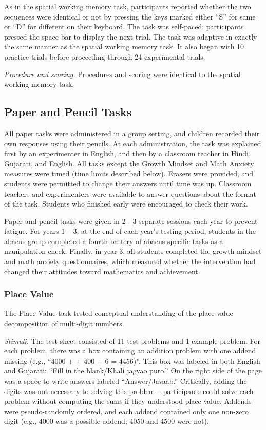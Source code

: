 \documentclass[11pt]{article}
\begin{document}
As in the spatial working memory task, participants reported whether the two sequences were identical or not by pressing the keys marked either ``S'' for same or ``D'' for different on their keyboard. The task was self-paced: participants pressed the space-bar to display the next trial. The task was adaptive in exactly the same manner as the spatial working memory task. It also began with 10 practice trials before proceeding through 24 experimental trials.

{\it Procedure and scoring.} Procedures and scoring were identical to the spatial working memory task.

\subsection{Paper and Pencil Tasks}

All paper tasks were administered in a group setting, and children recorded their own responses using their pencils. At each administration, the task was explained first by an experimenter in English, and then by a classroom teacher in Hindi, Gujarati, and English. All tasks except the Growth Mindset and Math Anxiety measures were timed (time limits described below). Erasers were provided, and students were permitted to change their answers until time was up. Classroom teachers and experimenters were available to answer questions about the format of the task. Students who finished early were encouraged to check their work.

Paper and pencil tasks were given in 2 - 3 separate sessions each year to prevent fatigue. For years 1 -- 3, at the end of each year's testing period, students in the abacus group completed a fourth battery of abacus-specific tasks as a manipulation check. Finally, in year 3, all students completed the growth mindset and math anxiety questionnaires, which measured whether the intervention had changed their attitudes toward mathematics and achievement.

\subsubsection{Place Value}

The Place Value task tested conceptual understanding of the place value decomposition of multi-digit numbers.

{\it Stimuli.}  The test sheet consisted of 11 test problems and 1 example problem. For each problem, there was a box containing an addition problem with one addend missing (e.g., ``4000 + \underline{\hspace{1cm}} + 400 + 6 = 4456)''. This box was labeled in both English and Gujarati: “Fill in the blank/Khali jagyao puro.” On the right side of the page was a space to write answers labeled “Answer/Javaab.” Critically, adding the digits was not necessary to solving this problem -- participants could solve each problem without computing the sums if they understood place value. Addends were pseudo-randomly ordered, and each addend contained only one non-zero digit (e.g., 4000 was a possible addend; 4050 and 4500 were not).
\end{document}
